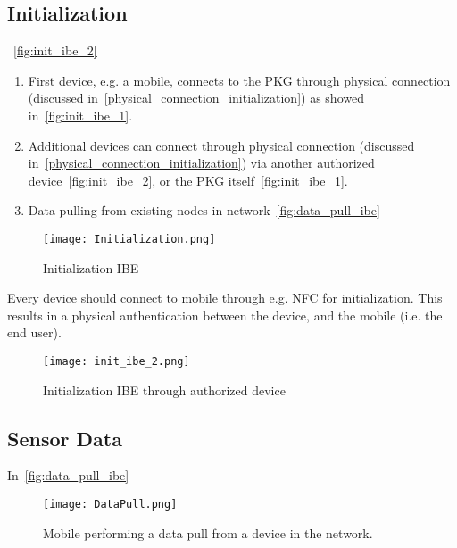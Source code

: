 \subsection{Initialization}
~\autoref{fig:init_ibe_2}

\begin{enumerate}
  \item First device, e.g. a mobile, connects to the \gls{PKG} through physical connection (discussed in~\autoref{physical_connection_initialization}) as showed in~\autoref{fig:init_ibe_1}.
  \item Additional devices can connect through physical connection (discussed in~\autoref{physical_connection_initialization}) via another authorized device~\autoref{fig:init_ibe_2}, or the \gls{PKG} itself~\autoref{fig:init_ibe_1}. 
  \item Data pulling from existing nodes in network~\autoref{fig:data_pull_ibe}
\end{enumerate}

\begin{figure}[ht]
  \centering
  \texttt{[image: Initialization.png]}
  \caption{Initialization IBE}
  \label{fig:init_ibe_1}
\end{figure}

Every device should connect to mobile through e.g. \gls{NFC} for initialization.
This results in a physical authentication between the device, and the mobile (i.e. the end user).

\begin{figure}[ht]
  \centering
  \texttt{[image: init\_ibe\_2.png]}
  \caption{Initialization IBE through authorized device}
  \label{fig:init_ibe_2}
\end{figure}


\subsection{Sensor Data}

In~\autoref{fig:data_pull_ibe} 
\begin{figure}[ht]
  \centering
  \texttt{[image: DataPull.png]}
  \caption{Mobile performing a data pull from a device in the network.}
  \label{fig:data_pull_ibe}
\end{figure}

